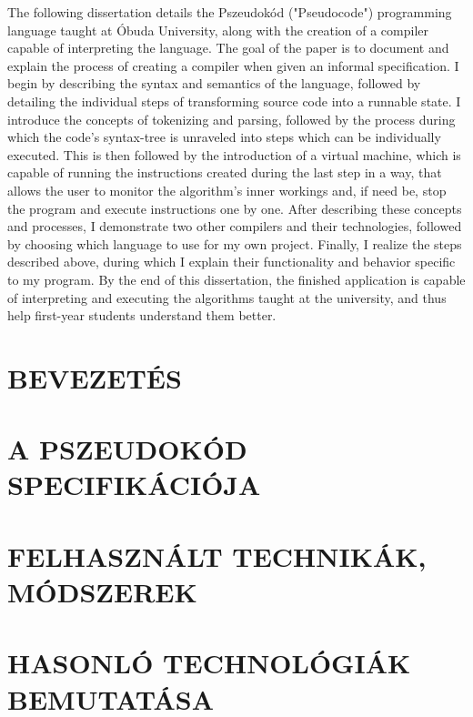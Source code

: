 \documentclass[12pt,a4paper]{article}
\begin{document}
The following dissertation details the Pszeudokód ("Pseudocode") programming language taught at Óbuda University, along with the creation of a compiler capable of interpreting the language. The goal of the paper is to document and explain the process of creating a compiler when given an informal specification. I begin by describing the syntax and semantics of the language, followed by detailing the individual steps of transforming source code into a runnable state. I introduce the concepts of tokenizing and parsing, followed by the process during which the code's syntax-tree is unraveled into steps which can be individually executed. This is then followed by the introduction of a virtual machine, which is capable of running the instructions created during the last step in a way, that allows the user to monitor the algorithm's inner workings and, if need be, stop the program and execute instructions one by one. After describing these concepts and processes, I demonstrate two other compilers and their technologies, followed by choosing which language to use for my own project. Finally, I realize the steps described above, during which I explain their functionality and behavior specific to my program. By the end of this dissertation, the finished application is capable of interpreting and executing the algorithms taught at the university, and thus help first-year students understand them better.

\newpage
\tableofcontents
\newpage


\clearpage
\section{BEVEZETÉS}


\clearpage
\section{A PSZEUDOKÓD SPECIFIKÁCIÓJA}
\label{sec:specification}


\clearpage
\section{FELHASZNÁLT TECHNIKÁK, MÓDSZEREK}
\label{sec:techniques}


\clearpage
\section{HASONLÓ TECHNOLÓGIÁK BEMUTATÁSA}
\label{sec:similar}

\end{document}
